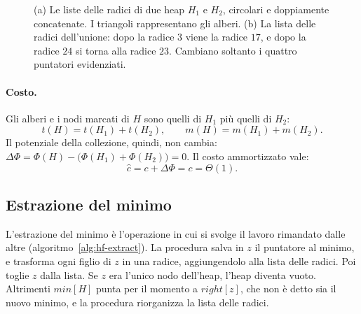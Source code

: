 \begin{figure}[htbp]
\caption{(a) Le liste delle radici di due heap $H_1$ e $H_2$, circolari e doppiamente concatenate. I triangoli rappresentano gli alberi. (b) La lista delle radici dell'unione: dopo la radice $3$ viene la radice $17$, e dopo la radice $24$ si torna alla radice $23$. Cambiano soltanto i quattro puntatori evidenziati.}
\label{fig:hf-unione}
\end{figure}

\paragraph{Costo.}
Gli alberi e i nodi marcati di $H$ sono quelli di $H_1$ più quelli di $H_2$:
\[
t(H) = t(H_1) + t(H_2), \qquad m(H) = m(H_1) + m(H_2).
\]
Il potenziale della collezione, quindi, non cambia: $\Delta\Phi = \Phi(H) - \bigl(\Phi(H_1) + \Phi(H_2)\bigr) = 0$. Il costo ammortizzato vale:
\[
\hat{c} = c + \Delta\Phi = c = \Theta(1).
\]

\subsection{Estrazione del minimo}\label{sec:hf-extract}
L'estrazione del minimo è l'operazione in cui si svolge il lavoro rimandato dalle altre (algoritmo~\ref{alg:hf-extract}). La procedura salva in $z$ il puntatore al minimo, e trasforma ogni figlio di $z$ in una radice, aggiungendolo alla lista delle radici. Poi toglie $z$ dalla lista. Se $z$ era l'unico nodo dell'heap, l'heap diventa vuoto. Altrimenti $\mathit{min}[H]$ punta per il momento a $\mathit{right}[z]$, che non è detto sia il nuovo minimo, e la procedura \Consolidate{} riorganizza la lista delle radici.

